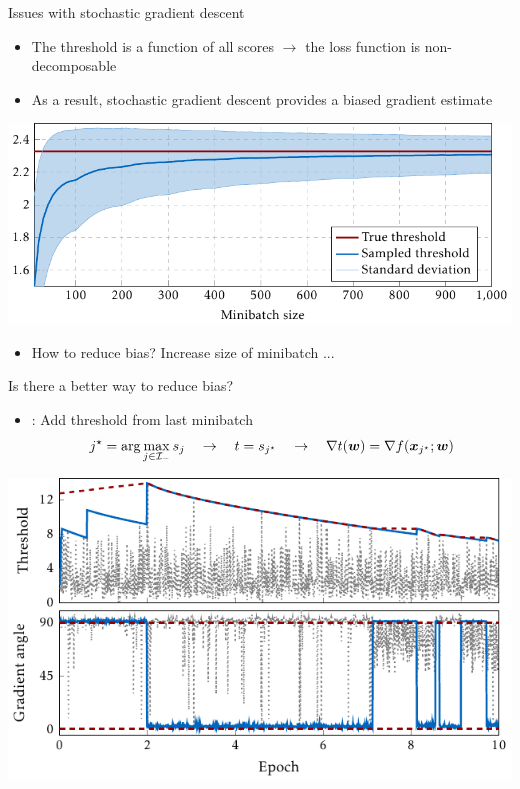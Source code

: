 \documentclass[10pt, aspectratio=169]{beamer}
\begin{document}
\begin{frame}{Issues with stochastic gradient descent}
  \begin{itemize}
    \item The threshold is a function of all scores $\rightarrow$ the loss function is non-decomposable
    \item As a result, stochastic gradient descent provides a biased gradient estimate
  \end{itemize}
  \begin{center}
    \includegraphics[width=\linewidth, height=0.6\textheight, keepaspectratio]{
      ../images/deep_threshold_bias.pdf
    }
  \end{center}
  \begin{itemize}
    \item How to reduce bias? Increase size of minibatch ...
  \end{itemize}
\end{frame}

\begin{frame}{Is there a better way to reduce bias?}
  \begin{itemize}
    \item \DeepTopPush: Add threshold from last minibatch
    \begin{equation*}
      j^{\star} = \arg \max_{j \in \mathcal{I}_{-}} s_j \quad \rightarrow \quad 
      t = s_{j^{\star}}\quad \rightarrow \quad 
      \nabla t(\bm{w}) = \nabla f(\bm{x}_{j^{\star}}; \bm{w})
    \end{equation*}
  \end{itemize}
  \begin{center}
    \includegraphics[width=\linewidth, height=0.75\textheight, keepaspectratio]{
      ../images/deep_thresholds.pdf
    }
  \end{center}
\end{frame}
\end{document}
